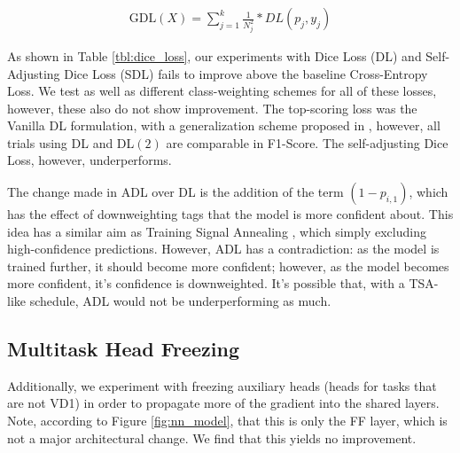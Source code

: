 \documentclass[11pt]{article}
\newcommand\nd{VD1\xspace}
\begin{document}
\begin{gather}
    \text{GDL}(X) = \sum_{j=1}^{k} \frac{1}{N_j^2} * DL(p_j, y_j)
\end{gather}

As shown in Table \ref{tbl:dice_loss}, our experiments with Dice Loss (DL) and Self-Adjusting Dice Loss (SDL) fails to improve above the baseline Cross-Entropy Loss. We test as well as different class-weighting schemes for all of these losses, however, these also do not show improvement. The top-scoring loss was the Vanilla DL formulation, with a generalization scheme proposed in \cite{sudre2017generalised}, however, all trials using DL and DL${(2)}$ are comparable in F1-Score. The self-adjusting Dice Loss, however, underperforms. 

The change made in ADL over DL is the addition of the term $(1 - p_{i, 1})$, which has the effect of downweighting tags that the model is more confident about. This idea has a similar aim as Training Signal Annealing \cite{xie2019unsupervised}, which simply excluding high-confidence predictions. However, ADL has a contradiction: as the model is trained further, it should become more confident; however, as the model becomes more confident, it's confidence is downweighted. It's possible that, with a TSA-like schedule, ADL would not be underperforming as much.

\subsection{Multitask Head Freezing}

Additionally, we experiment with freezing auxiliary heads (heads for tasks that are not \nd) in order to propagate more of the gradient into the shared layers. Note, according to Figure \ref{fig:nn_model}, that this is only the FF layer, which is not a major architectural change. We find that this yields no improvement.

%
%
\end{document}
